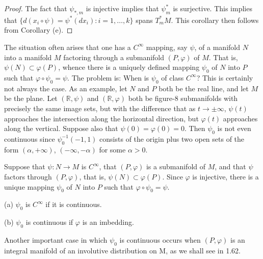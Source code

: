 \begin{proof}
	The fact that $\psi_{*,m}$ is injective implies that $\psi_m^{*}$ is surjective. This implies that $\{d(x_i \circ \psi) = \psi^{*}(dx_i)\colon i = 1, \ldots, k\}$ spans $T_{m}^{*} M$. This corollary then follows from Corollary (e).
\end{proof}

\label{thm:1.31}
The situation often arises that one has a $C^{\infty}$ mapping, say $\psi$, of a manifold $N$ into a manifold $M$ factoring through a submanifold $(P,\varphi)$ of $M$. That is, $\psi(N) \subset \varphi(P)$, whence there is a uniquely defined mapping $\psi_0$ of $N$ into $P$ such that $\varphi \circ \psi_0 = \psi$. The problem is: When is $\psi_0$ of class $C^{\infty}$? This is certainly not always the case. As an example, let $N$ and $P$ both be the real line, and let $M$ be the plane. Let $(\mathbb{R},\psi)$ and $(\mathbb{R},\varphi)$ both be figure-8 submanifolds with precisely the same image sets, but with the difference that as $t \to \pm \infty$, $\psi(t)$ approaches the intersection along the horizontal direction, but $\varphi(t)$ approaches along the vertical. Suppose also that $\psi(0) = \varphi(0) = 0$. Then $\psi_0$ is not even continuous since $\psi_0^{-1}(-1,1)$ consists of the origin plus two open sets of the form $(\alpha,+\infty)$, $(-\infty,-\alpha)$ for some $\alpha > 0$.

\begin{center}
\end{center}

\begin{center}
\end{center}

\begin{theorem}\label{thm:1.32}
	Suppose that $\psi: N \to M$ is $C^\infty$, that $(P, \varphi)$ is a submanifold of $M$, and that $\psi$ factors through $(P, \varphi)$, that is, $\psi(N) \subset \varphi(P)$. Since $\varphi$ is injective, there is a unique mapping $\psi_0$ of $N$ into $P$ such that $\varphi \circ \psi_0 = \psi$.

	\begin{center}
	\end{center}

	(a)  $ \psi_{0} $ is  $ C^{\infty} $ if it is continuous.

	(b)  $ \psi_{0} $ is continuous if  $ \varphi $ is an imbedding.

	Another important case in which $\psi_{0}$ is continuous occurs when  $ (P,\varphi) $ is an integral manifold of an involutive distribution on M, as we shall see in 1.62.

\end{theorem}

